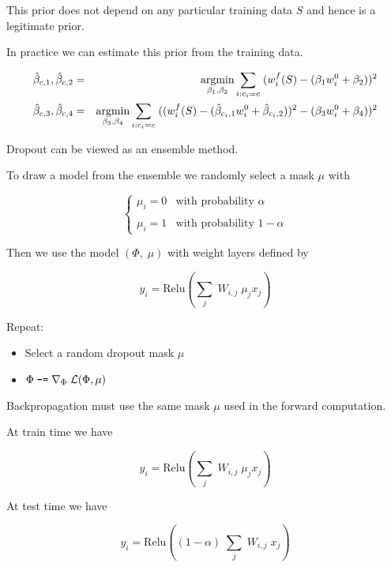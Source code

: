 {{This prior does not depend on any particular training data $S$ and hence is a legitimate prior.

\vfill
In practice we can estimate this prior from the training data.

\begin{eqnarray*}
\hat{\beta}_{c,1},\hat{\beta}_{c,2} & = & \operatorname*{argmin}_{\beta_1,\beta_2} \sum_{i: c_i = c}\;(w_i^f(S) - (\beta_1 w_i^0 + \beta_2))^2 \\
\hat{\beta}_{c,3},\hat{\beta}_{c,4} &  = & \operatorname*{argmin}_{\beta_3,\beta_4} \sum_{i: c_i = c}\;((w_i^f(S) - (\hat{\beta}_{c_i,1} w_i^0 + \hat{\beta}_{c_i,2}))^2 - (\beta_3 w_i^0 + \beta_4))^2
\end{eqnarray*}
}


Dropout can be viewed as an ensemble method.


\vfill
To draw a model from the ensemble we randomly select a mask $\mu$ with

$$\left\{\begin{array}{ll} \mu_i = 0 & \mbox{with probability $\alpha$} \\ \\ \mu_i = 1 & \mbox{with probability $1-\alpha$}
\end{array}\right.$$

\vfill
Then we use the model $(\Phi,\;\mu)$ with weight layers defined by


\vfill
$$y_i = \mathrm{Relu}\left(\sum_j\;W_{i,j} \;\mu_jx_j\right)$$


Repeat:

\vfill

\begin{itemize}
\item Select a random dropout mask $\mu$
  
\vfill
\item $\Phi \;\mbox{\tt -=}\; \nabla_\Phi\; {\cal L}(\Phi, \mu)$
\end{itemize}

\vfill
Backpropagation must use the same mask $\mu$ used in the forward computation.



\vfill
At train time we have

\vfill
$$y_i = \mathrm{Relu}\left(\sum_j\;W_{i,j} \;\mu_j x_j\right)$$


\vfill
At test time we have

\vfill
$$y_i = \mathrm{Relu}\left((1-\alpha)\;\sum_j\;W_{i,j} \;x_j\right)$$

}
